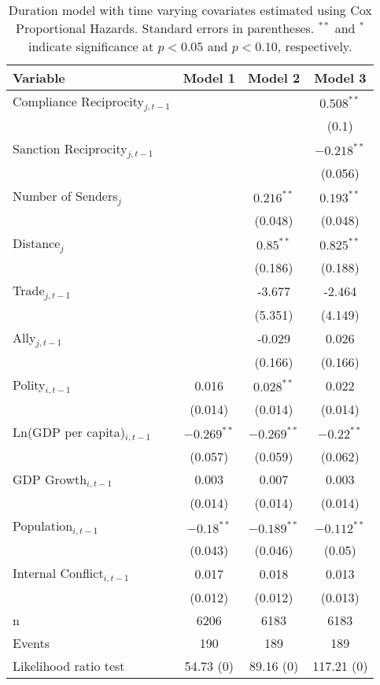 \begin{table}[ht]
\centering
{\normalsize
\begin{tabular}{lccc}
 Variable & Model 1 & Model 2 & Model 3 \\ 
  \hline
\hline
Compliance Reciprocity$_{j,t-1}$ &  &  & $0.508^{\ast\ast}$ \\ 
   &  &  & (0.1) \\ 
  Sanction Reciprocity$_{j,t-1}$ &  &  & $-0.218^{\ast\ast}$ \\ 
   &  &  & (0.056) \\ 
   \hline
Number of Senders$_{j}$ &  & $0.216^{\ast\ast}$ & $0.193^{\ast\ast}$ \\ 
   &  & (0.048) & (0.048) \\ 
  Distance$_{j}$ &  & $0.85^{\ast\ast}$ & $0.825^{\ast\ast}$ \\ 
   &  & (0.186) & (0.188) \\ 
  Trade$_{j,t-1}$ &  & -3.677 & -2.464 \\ 
   &  & (5.351) & (4.149) \\ 
  Ally$_{j,t-1}$ &  & -0.029 & 0.026 \\ 
   &  & (0.166) & (0.166) \\ 
   \hline
Polity$_{i,t-1}$ & 0.016 & $0.028^{\ast\ast}$ & 0.022 \\ 
   & (0.014) & (0.014) & (0.014) \\ 
  Ln(GDP per capita)$_{i,t-1}$ & $-0.269^{\ast\ast}$ & $-0.269^{\ast\ast}$ & $-0.22^{\ast\ast}$ \\ 
   & (0.057) & (0.059) & (0.062) \\ 
  GDP Growth$_{i,t-1}$ & 0.003 & 0.007 & 0.003 \\ 
   & (0.014) & (0.014) & (0.014) \\ 
  Population$_{i,t-1}$ & $-0.18^{\ast\ast}$ & $-0.189^{\ast\ast}$ & $-0.112^{\ast\ast}$ \\ 
   & (0.043) & (0.046) & (0.05) \\ 
  Internal Conflict$_{i,t-1}$ & 0.017 & 0.018 & 0.013 \\ 
   & (0.012) & (0.012) & (0.013) \\ 
   \hline
n & 6206 & 6183 & 6183 \\ 
  Events & 190 & 189 & 189 \\ 
  Likelihood ratio test & 54.73 (0) & 89.16 (0) & 117.21 (0) \\ 
   \hline
\hline
\end{tabular}
}
\caption{Duration model with time varying covariates estimated using Cox Proportional Hazards. Standard errors in parentheses. $^{**}$ and $^{*}$ indicate significance at $p< 0.05 $ and $p< 0.10 $, respectively.} 
\label{tab:regResults}
\end{table}
